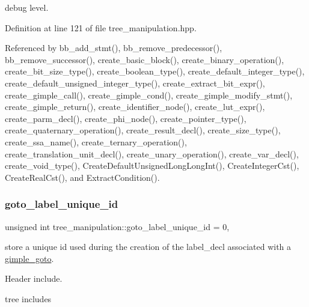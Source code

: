 debug level. 



Definition at line 121 of file tree\+\_\+manipulation.\+hpp.



Referenced by bb\+\_\+add\+\_\+stmt(), bb\+\_\+remove\+\_\+predecessor(), bb\+\_\+remove\+\_\+successor(), create\+\_\+basic\+\_\+block(), create\+\_\+binary\+\_\+operation(), create\+\_\+bit\+\_\+size\+\_\+type(), create\+\_\+boolean\+\_\+type(), create\+\_\+default\+\_\+integer\+\_\+type(), create\+\_\+default\+\_\+unsigned\+\_\+integer\+\_\+type(), create\+\_\+extract\+\_\+bit\+\_\+expr(), create\+\_\+gimple\+\_\+call(), create\+\_\+gimple\+\_\+cond(), create\+\_\+gimple\+\_\+modify\+\_\+stmt(), create\+\_\+gimple\+\_\+return(), create\+\_\+identifier\+\_\+node(), create\+\_\+lut\+\_\+expr(), create\+\_\+parm\+\_\+decl(), create\+\_\+phi\+\_\+node(), create\+\_\+pointer\+\_\+type(), create\+\_\+quaternary\+\_\+operation(), create\+\_\+result\+\_\+decl(), create\+\_\+size\+\_\+type(), create\+\_\+ssa\+\_\+name(), create\+\_\+ternary\+\_\+operation(), create\+\_\+translation\+\_\+unit\+\_\+decl(), create\+\_\+unary\+\_\+operation(), create\+\_\+var\+\_\+decl(), create\+\_\+void\+\_\+type(), Create\+Default\+Unsigned\+Long\+Long\+Int(), Create\+Integer\+Cst(), Create\+Real\+Cst(), and Extract\+Condition().

\mbox{\label{classtree__manipulation_a6f392d088e10f48177cbb44989499e4e}} 
\subsubsection{\texorpdfstring{goto\+\_\+label\+\_\+unique\+\_\+id}{goto\_label\_unique\_id}}
{\footnotesize\ttfamily unsigned int tree\+\_\+manipulation\+::goto\+\_\+label\+\_\+unique\+\_\+id = 0\hspace{0.3cm}{\ttfamily [static]}, {\ttfamily [private]}}



store a unique id used during the creation of the label\+\_\+decl associated with a \hyperlink{structgimple__goto}{gimple\+\_\+goto}. 

Header include.

tree includes 

